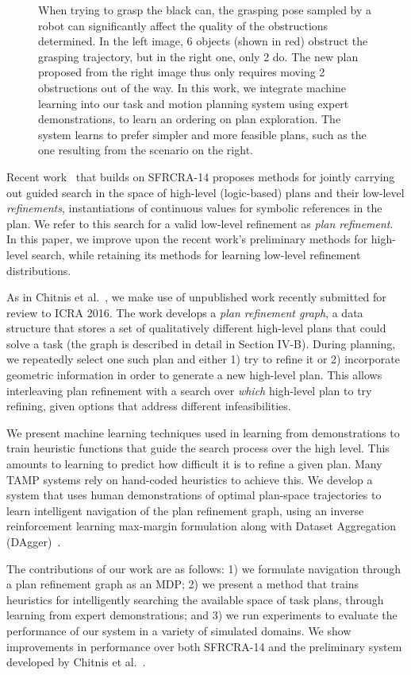 \begin{figure}[t]
  \caption{\small{When trying to grasp the black can, the grasping pose sampled by a robot can
significantly affect the quality of the obstructions determined. In the left image, 6 objects (shown in red) obstruct the
grasping trajectory, but in the right one, only 2 do. The new plan proposed from the right image thus only
requires moving 2 obstructions out of the way. In this work, we integrate machine learning into our task and
motion planning system using expert demonstrations, to learn an ordering on plan exploration. The system
learns to prefer simpler and more feasible plans, such as the one resulting from the scenario on the right.}}
  \label{fig:cover}
\end{figure}

Recent work~\cite{chitnis2015mlpc} that builds on SFRCRA-14 proposes
methods for jointly carrying out guided search in the space of
high-level (logic-based) plans and their low-level
\emph{refinements}, instantiations of continuous values for
symbolic references in the plan. We refer to this search for a valid low-level
refinement as \emph{plan refinement}. In this paper, we improve upon
the recent work's preliminary methods for high-level search, while retaining its methods
for learning low-level refinement distributions.

As in Chitnis et al.~\cite{chitnis2015mlpc}, we make use of unpublished work
recently submitted for review to ICRA 2016. The work develops
a \emph{plan refinement graph}, a data structure that stores a
set of qualitatively different high-level plans that could solve a task (the graph is
described in detail in Section IV-B).
During planning, we repeatedly select one such plan and either 1) try to
refine it or 2) incorporate geometric information in order to generate a new high-level
plan. This allows interleaving plan refinement with a
search over \emph{which} high-level plan to try refining, given options
that address different infeasibilities.

We present machine learning techniques used in learning from demonstrations
to train heuristic functions that guide the search process over the high level.
This amounts to learning to predict how difficult it is to refine a given plan.
Many TAMP systems rely on hand-coded heuristics to achieve this. We develop a system that uses human
demonstrations of optimal plan-space trajectories to learn intelligent navigation
of the plan refinement graph, using an inverse reinforcement learning
max-margin formulation along with Dataset Aggregation (DAgger)~\cite{ross2010dagger}.

The contributions of our work are as follows: 1) we formulate navigation through a plan
refinement graph as an MDP; 2) we present a method that trains
heuristics for intelligently searching the available space of task plans, through learning
from expert demonstrations; and 3)
we run experiments to evaluate the performance of our system in a
variety of simulated domains. We show improvements in performance over both SFRCRA-14
and the preliminary system developed by Chitnis et al.~\cite{chitnis2015mlpc}.
